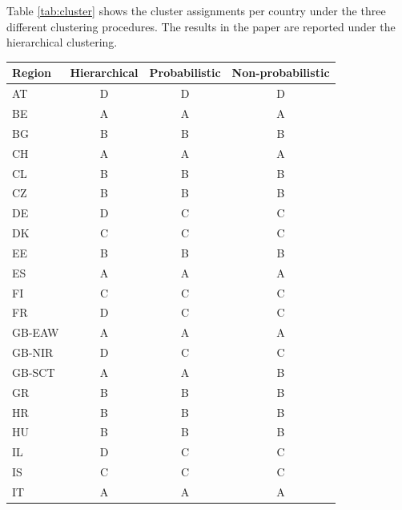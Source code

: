 \documentclass[12pt]{article}
\begin{document}
Table \ref{tab:cluster} shows the cluster assignments per country under the three different clustering procedures. The results in the paper are reported under the hierarchical clustering.

\begin{table}[h]
\begin{tabular}{lccc}
\toprule
Region & Hierarchical & Probabilistic & Non-probabilistic \\
\midrule
AT          & D            & D              & D              \\
BE          & A            & A              & A              \\
BG          & B            & B              & B              \\
CH          & A            & A              & A              \\
CL          & B            & B              & B              \\
CZ          & B            & B              & B              \\
DE          & D            & C              & C              \\
DK          & C            & C              & C              \\
EE          & B            & B              & B              \\
ES          & A            & A              & A              \\
FI          & C            & C              & C              \\
FR          & D            & C              & C              \\
GB-EAW      & A            & A              & A              \\
GB-NIR      & D            & C              & C              \\
GB-SCT      & A            & A              & B              \\
GR          & B            & B              & B              \\
HR          & B            & B              & B              \\
HU          & B            & B              & B              \\
IL          & D            & C              & C              \\
IS          & C            & C              & C              \\
IT          & A            & A              & A              \\

\end{tabular}
\end{table}
\end{document}
